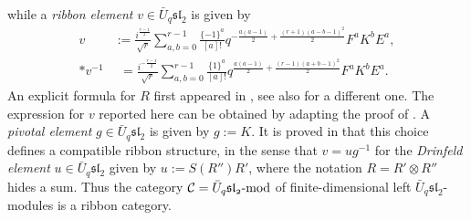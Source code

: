 \documentclass[a4paper,reqno]{amsart}
\theoremstyle{definition}
\theoremstyle{remark}
\newcommand{\calC}{\mathcal{C}}
\newcommand{\mods}[1]{\operatorname{\mathnormal{#1}-mod}}
\newcommand{\fsl}{\mathfrak{sl}}
\begin{document}
while a \textit{ribbon element} $v \in \bar{U}_q \fsl_2$ is given by
\begin{align*}
 v &:= \frac{i^{\frac{r-1}{2}}}{\sqrt{r}} \sum_{a,b = 0}^{r - 1} \frac{\{ -1 \}^a}{[a]!} q^{-\frac{a(a-1)}{2} + \frac{(r+1)(a-b-1)^2}{2}} F^a K^b E^a, \\*
 v^{-1} &\phantom{:}= \frac{i^{-\frac{r-1}{2}}}{\sqrt{r}} \sum_{a,b = 0}^{r - 1} \frac{\{ 1 \}^a}{[a]!} q^{\frac{a(a-1)}{2} + \frac{(r-1)(a+b-1)^2}{2}} F^a K^b E^a.
\end{align*}
An explicit formula for $R$ first appeared in \cite[Sec.~3.5]{R93}, see also \cite[Sec.~4.5]{Oh02} for a different one. The expression for $v$ reported here can be obtained by adapting the proof of \cite[Thm.~4.1.1]{FGST05}. A \textit{pivotal element} $g \in \bar{U}_q \fsl_2$ is given by $g := K$. It is proved in \cite[Prop.~XIV.6.5]{K95} that this choice defines a compatible ribbon structure, in the sense that $v = ug^{-1}$ for the \textit{Drinfeld element} $u \in \bar{U}_q \fsl_2$ given by $u := S(R'')R'$, where the notation $R = R' \otimes R''$ hides a sum. Thus the category $\calC = \mods{\bar{U}_q \fsl_2}$ of finite-dimensional left $\bar{U}_q \fsl_2$-modules is a ribbon category.
\end{document}
